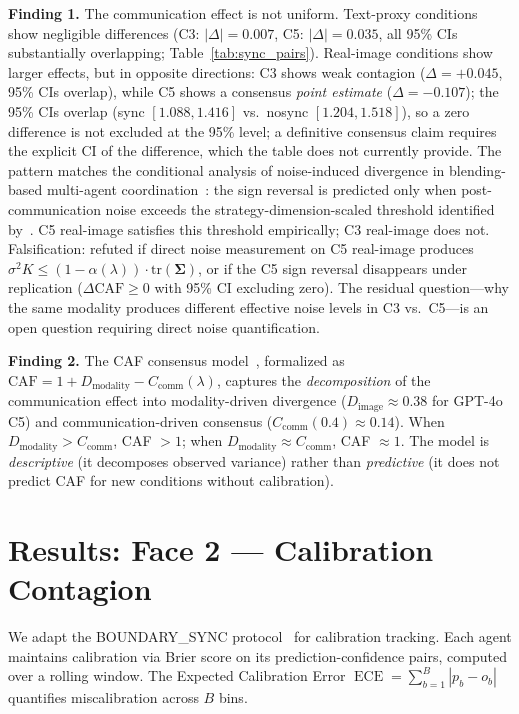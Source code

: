 \documentclass[11pt]{article}
\DeclareMathOperator{\ECE}{ECE}
\begin{document}
\textbf{Finding 1.} The communication effect is not uniform. Text-proxy conditions show negligible differences (C3: $|\Delta| = 0.007$, C5: $|\Delta| = 0.035$, all 95\% CIs substantially overlapping; Table~\ref{tab:sync_pairs}). Real-image conditions show larger effects, but in opposite directions: C3 shows weak contagion ($\Delta = +0.045$, 95\% CIs overlap), while C5 shows a consensus \emph{point estimate} ($\Delta = -0.107$); the 95\% CIs overlap (sync $[1.088, 1.416]$ vs.\ nosync $[1.204, 1.518]$), so a zero difference is not excluded at the 95\% level; a definitive consensus claim requires the explicit CI of the difference, which the table does not currently provide. The pattern matches the conditional analysis of noise-induced divergence in blending-based multi-agent coordination~\cite{kapetanakis2014balanced,foerster2016learning}: the sign reversal is predicted only when post-communication noise exceeds the strategy-dimension-scaled threshold identified by~\citet{foerster2016learning}. C5 real-image satisfies this threshold empirically; C3 real-image does not. Falsification: refuted if direct noise measurement on C5 real-image produces $\sigma^2 K \leq (1 - \alpha(\lambda)) \cdot \text{tr}(\boldsymbol{\Sigma})$, or if the C5 sign reversal disappears under replication ($\Delta\text{CAF} \geq 0$ with 95\% CI excluding zero). The residual question---why the same modality produces different effective noise levels in C3 vs.\ C5---is an open question requiring direct noise quantification.

\textbf{Finding 2.} The CAF consensus model~\cite{liu2026epc}, formalized as $\text{CAF} = 1 + D_{\text{modality}} - C_{\text{comm}}(\lambda)$, captures the \textit{decomposition} of the communication effect into modality-driven divergence ($D_{\text{image}} \approx 0.38$ for GPT-4o C5) and communication-driven consensus ($C_{\text{comm}}(0.4) \approx 0.14$). When $D_{\text{modality}} > C_{\text{comm}}$, CAF $> 1$; when $D_{\text{modality}} \approx C_{\text{comm}}$, CAF $\approx 1$. The model is \textit{descriptive} (it decomposes observed variance) rather than \textit{predictive} (it does not predict CAF for new conditions without calibration).

\section{Results: Face 2 --- Calibration Contagion}

We adapt the BOUNDARY\_SYNC protocol~\citep{liu2026boundarysync} for calibration tracking. Each agent maintains calibration via Brier score on its prediction-confidence pairs, computed over a rolling window. The Expected Calibration Error $\ECE = \sum_{b=1}^{B} |p_b - o_b|$ quantifies miscalibration across $B$ bins.
\end{document}
